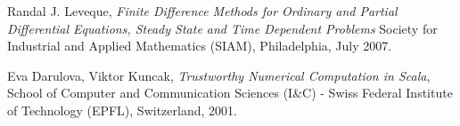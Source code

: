 \begin{thebibliography}{9}

    Randal J. Leveque,
    \emph{Finite Difference Methods for Ordinary and Partial Differential Equations,
        Steady State and Time Dependent Problems}
    Society for Industrial and Applied Mathematics (SIAM),
    Philadelphia,
    July 2007.

    Eva Darulova, Viktor Kuncak,
    \emph{Trustworthy Numerical Computation in Scala},
    School of Computer and Communication Sciences (I\&C) -
    Swiss Federal Institute of Technology (EPFL), Switzerland,
    2001.

\end{thebibliography}

